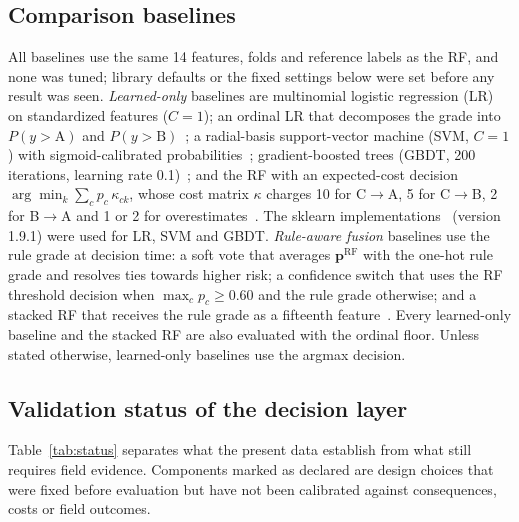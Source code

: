 \documentclass[journal]{IEEEtran}
\newcommand{\CtoA}{C$\rightarrow$A}
\newcommand{\CtoB}{C$\rightarrow$B}
\newcommand{\BtoA}{B$\rightarrow$A}
\begin{document}
\subsection{Comparison baselines}
\label{sec:baselines}
All baselines use the same 14 features, folds and reference labels as the RF, and none was tuned; library defaults or the fixed settings below were set before any result was seen. \emph{Learned-only} baselines are multinomial logistic regression (LR) on standardized features ($C=1$); an ordinal LR that decomposes the grade into $P(y>\mathrm{A})$ and $P(y>\mathrm{B})$~\cite{FrankHall2001}; a radial-basis support-vector machine (SVM, $C=1$) with sigmoid-calibrated probabilities~\cite{Cortes1995}; gradient-boosted trees (GBDT, 200 iterations, learning rate 0.1)~\cite{Friedman2001}; and the RF with an expected-cost decision $\arg\min_k\sum_c p_c\,\kappa_{ck}$, whose cost matrix $\kappa$ charges 10 for \CtoA, 5 for \CtoB, 2 for \BtoA{} and 1 or 2 for overestimates~\cite{Elkan2001}. The sklearn implementations~\cite{Pedregosa2011} (version 1.9.1) were used for LR, SVM and GBDT. \emph{Rule-aware fusion} baselines use the rule grade at decision time: a soft vote that averages $\mathbf p^{\mathrm{RF}}$ with the one-hot rule grade and resolves ties towards higher risk; a confidence switch that uses the RF threshold decision when $\max_c p_c\geq0.60$ and the rule grade otherwise; and a stacked RF that receives the rule grade as a fifteenth feature~\cite{Wolpert1992}. Every learned-only baseline and the stacked RF are also evaluated with the ordinal floor. Unless stated otherwise, learned-only baselines use the argmax decision.

\subsection{Validation status of the decision layer}
\label{sec:status}
Table~\ref{tab:status} separates what the present data establish from what still requires field evidence. Components marked as declared are design choices that were fixed before evaluation but have not been calibrated against consequences, costs or field outcomes.
\end{document}
